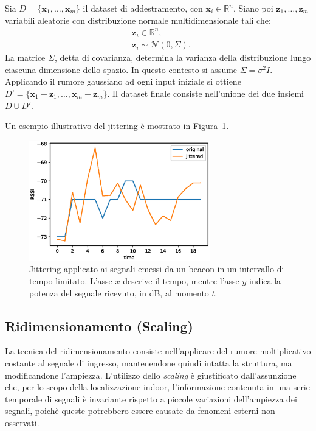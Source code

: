 Sia \(D = \{\bm x_1, \dotsc, \bm x_m\}\) il dataset di addestramento, con 
\(\bm x_i \in \mathbb{R}^n \). Siano poi \(\bm z_1,
  \dotsc, \bm z_m \) variabili aleatorie con distribuzione normale
multidimensionale tali che: 
\begin{align*}
& \bm z_i \in \mathbb{R}^n, \\ 
& \bm z_i \sim \mathcal{N}(0, \Sigma).
\end{align*}
La matrice \(\Sigma\), detta di covarianza, determina la varianza della
distribuzione lungo ciascuna dimensione dello spazio. In questo contesto si
assume \(\Sigma=\sigma^2I\). Applicando il rumore gaussiano ad ogni input
iniziale si ottiene \(D' = \{\bm x_1 + \bm z_1, \dotsc, \bm x_m + \bm z_m\}\).
Il dataset finale consiste nell'unione dei due insiemi \( D \cup D'\).

Un esempio illustrativo del jittering è mostrato in Figura~\ref{fig:jitter}.
\begin{figure}[!htp]
  \centering\includegraphics[width=0.7\textwidth]{./img/jittering.eps}
  \caption{Jittering applicato ai segnali emessi da un beacon in un intervallo
    di tempo limitato. L'asse \(x\) descrive il tempo, mentre l'asse \(y\)
    indica la potenza del segnale ricevuto, in dB, al momento \(t\).}%
  \label{fig:jitter}%
\end{figure}

\subsection{Ridimensionamento (Scaling)}
La tecnica del ridimensionamento consiste nell'applicare del rumore
moltiplicativo costante al segnale di ingresso, mantenendone quindi intatta la
struttura, ma modificandone l'ampiezza. L'utilizzo dello \emph{scaling} è
giustificato dall'assunzione che, per lo scopo della localizzazione indoor,
l'informazione contenuta in una serie temporale di segnali è invariante
rispetto a piccole variazioni dell'ampiezza dei segnali, poichè queste
potrebbero essere causate da fenomeni esterni non osservati.

